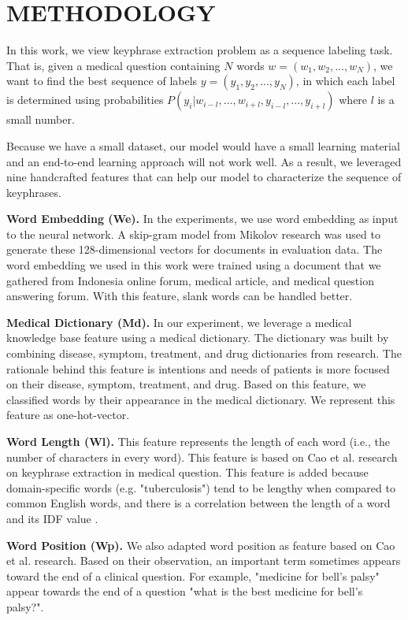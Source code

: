 \documentclass[sigconf]{acmart}
\begin{document}
\section{METHODOLOGY}
In this work, we view keyphrase extraction problem as a sequence labeling task. That is, given a medical question containing $N$ words $w = (w_1, w_2,...,w_N)$, we want to find the best sequence of labels $y = (y_1, y_2,..., y_N)$, in which each label is determined using probabilities $P(y_i|w_{i-l},...,w_{i+l},y_{i-l},...,y_{i+l})$ where $l$ is a small number.

Because we have a small dataset, our model would have a small learning material and an end-to-end learning approach will not work well. As a result, we leveraged nine handcrafted features that can help our model to characterize the sequence of keyphrases.

\textbf{Word Embedding (We).} In the experiments, we use word embedding as input to the neural network. A skip-gram model from Mikolov \cite{mikolov2013wordembed} research was used to generate these 128-dimensional vectors for documents in evaluation data. The word embedding we used in this work were trained using a document that we gathered from Indonesia online forum, medical article, and medical question answering forum. With this feature, slank words can be handled better.

\textbf{Medical Dictionary (Md).} In our experiment, we leverage a medical knowledge base feature using a medical dictionary. The dictionary was built by combining disease, symptom, treatment, and drug dictionaries from \cite{skripsiKakAbid} research. The rationale behind this feature is intentions and needs of patients is more focused on their disease, symptom, treatment, and drug. Based on this feature, we classified words by their appearance in the medical dictionary. We represent this feature as one-hot-vector. 

\textbf{Word Length (Wl).} This feature represents the length of each word (i.e., the number of characters in every word). This feature is based on Cao et al. \cite{cao2010automatically} research on keyphrase extraction in medical question. This feature is added because domain-specific words (e.g. "tuberculosis") tend to be lengthy when compared to common English words, and there is a correlation between the length of a word and its IDF value \cite{cao2010automatically}.

\textbf{Word Position (Wp).} We also adapted word position as feature based on Cao et al. \cite{cao2010automatically} research. Based on their observation, an important term sometimes appears toward the end of a clinical question. For example, "medicine for bell's palsy" appear towards the end of a question "what is the best medicine for bell's palsy?". 
\end{document}

